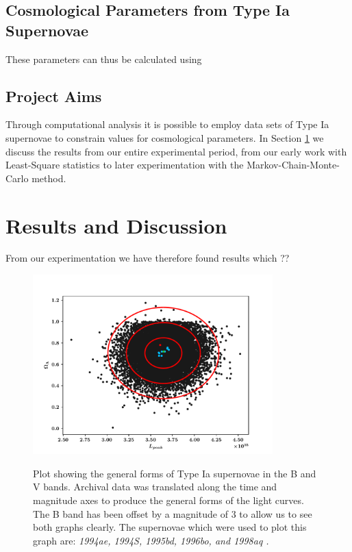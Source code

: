 \documentclass[twocolumn]{revtex4}
\begin{document}
\vspace{-3ex}
\subsection{Cosmological Parameters from Type Ia Supernovae}
\vspace{-2ex}
These parameters can thus be calculated using 

\vspace{-3ex}
\subsection{Project Aims}
\vspace{-2ex}

Through computational analysis it is possible to employ data sets of Type Ia supernovae to constrain values for cosmological parameters. In Section \ref{sec:results_discussion} we discuss the results from our entire experimental period, from our early work with Least-Square statistics to later experimentation with the Markov-Chain-Monte-Carlo method. 

\vspace{-3ex}
\section{Results and Discussion} 
\label{sec:results_discussion}
\vspace{-2ex}
From our experimentation we have therefore found results which ??

\begin{figure}[!h]
\begin{center}
\includegraphics[width=9.25cm]{results/ol_lp_complete}
\caption[]{Plot showing the general forms of Type Ia supernovae in the B and V bands. Archival data was translated along the time and magnitude axes to produce the general forms of the light curves. The B band has been offset by a magnitude of $3$ to allow us to see both graphs clearly. The supernovae which were used to plot this graph are: \em{1994ae, 1994S, 1995bd, 1996bo, }\em  and \em{1998aq }\em \cite{jha, matheson}. }
\vspace{-3ex}
\label{fig:ol_lp_complete}
\end{center}
\end{figure}
\end{document}

